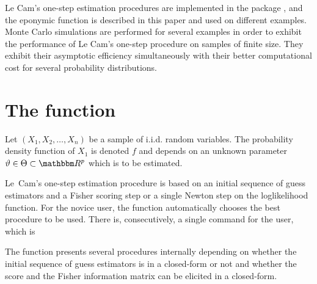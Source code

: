 Le Cam's one-step estimation procedures are implemented in the package , and the eponymic function  is described in this paper and used on different examples. Monte Carlo simulations are performed for several examples in order to exhibit the performance of Le Cam's one-step procedure on samples of finite size. They exhibit their asymptotic efficiency simultaneously with their better computational cost for several probability distributions.

\section{The function }

Let $(X_1,X_2, \ldots, X_n)$ be a sample of i.i.d. random variables. The probability density function of $X_1$ is denoted $f$ and depends on an unknown parameter $\vartheta \in \Theta \subset \mb{R}^p$ which is to be estimated.

Le~Cam's one-step estimation procedure is based on an initial sequence of guess estimators and a Fisher scoring step or a single Newton step on the loglikelihood function. For the novice user, the function  automatically chooses the best procedure to be used. There is, consecutively, a single command for the user, which is 


The function  presents several procedures internally depending on whether the initial sequence of guess estimators is in a closed-form or not and whether the score and the Fisher information matrix can be elicited in a closed-form.

